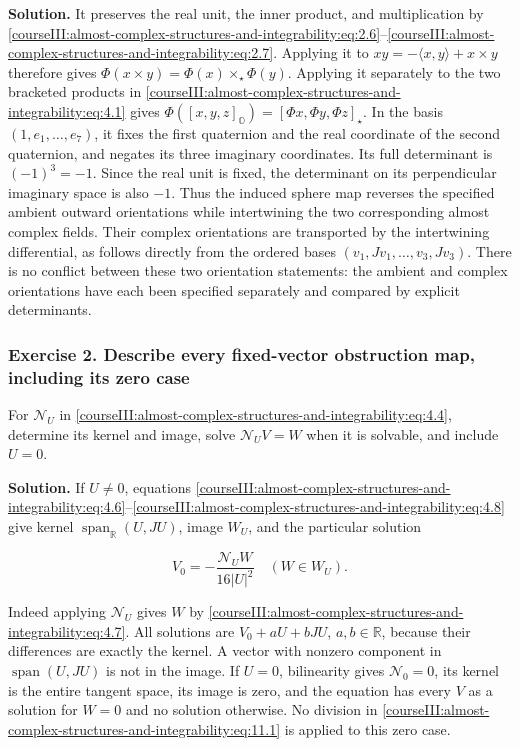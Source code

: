 \textbf{Solution.} It preserves the real unit, the inner product, and multiplication by \eqref{courseIII:almost-complex-structures-and-integrability:eq:2.6}--\eqref{courseIII:almost-complex-structures-and-integrability:eq:2.7}. Applying it to \(xy=-\langle x,y\rangle+x\times y\) therefore gives \(\Phi(x\times y)=\Phi(x)\times_\star\Phi(y)\). Applying it separately to the two bracketed products in \eqref{courseIII:almost-complex-structures-and-integrability:eq:4.1} gives \(\Phi([x,y,z]_{\mathbb O})=[\Phi x,\Phi y,\Phi z]_\star\). In the basis \((1,e_1,\ldots,e_7)\), it fixes the first quaternion and the real coordinate of the second quaternion, and negates its three imaginary coordinates. Its full determinant is \((-1)^3=-1\). Since the real unit is fixed, the determinant on its perpendicular imaginary space is also \(-1\). Thus the induced sphere map reverses the specified ambient outward orientations while intertwining the two corresponding almost complex fields. Their complex orientations are transported by the intertwining differential, as follows directly from the ordered bases \((v_1,Jv_1,\ldots,v_3,Jv_3)\). There is no conflict between these two orientation statements: the ambient and complex orientations have each been specified separately and compared by explicit determinants.

\subsubsection{Exercise 2. Describe every fixed-vector obstruction map, including its zero case}
\label{courseIII:almost-complex-structures-and-integrability:exercise-2}

For \(\mathcal N_U\) in \eqref{courseIII:almost-complex-structures-and-integrability:eq:4.4}, determine its kernel and image, solve \(\mathcal N_UV=W\) when it is solvable, and include \(U=0\).

\textbf{Solution.} If \(U\ne0\), equations \eqref{courseIII:almost-complex-structures-and-integrability:eq:4.6}--\eqref{courseIII:almost-complex-structures-and-integrability:eq:4.8} give kernel \(\operatorname{span}_{\mathbb R}(U,JU)\), image \(W_U\), and the particular solution

\begin{equation}
V_0=-\frac{\mathcal N_UW}{16|U|^2}\quad(W\in W_U).
\label{courseIII:almost-complex-structures-and-integrability:eq:11.1}
\end{equation}

Indeed applying \(\mathcal N_U\) gives \(W\) by \eqref{courseIII:almost-complex-structures-and-integrability:eq:4.7}. All solutions are \(V_0+aU+bJU\), \(a,b\in\mathbb R\), because their differences are exactly the kernel. A vector with nonzero component in \(\operatorname{span}(U,JU)\) is not in the image. If \(U=0\), bilinearity gives \(\mathcal N_0=0\), its kernel is the entire tangent space, its image is zero, and the equation has every \(V\) as a solution for \(W=0\) and no solution otherwise. No division in \eqref{courseIII:almost-complex-structures-and-integrability:eq:11.1} is applied to this zero case.

